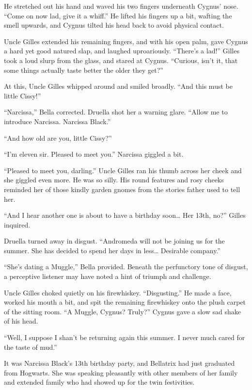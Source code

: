 He stretched out his hand and waved his two fingers underneath Cygnus’ nose. “Come on now lad, give it a whiff.” He lifted his fingers up a bit, wafting the smell upwards, and Cygnus tilted his head back to avoid physical contact.

Uncle Gilles extended his remaining fingers, and with his open palm, gave Cygnus a hard yet good natured slap, and laughed uproariously. “There’s a lad!” Gilles took a loud slurp from the glass, and stared at Cygnus. “Curious, isn’t it, that some things actually taste better the older they get?”

At this, Uncle Gilles whipped around and smiled broadly. “And this must be little Cissy!”

“Narcissa,” Bella corrected. Druella shot her a warning glare. “Allow me to introduce Narcissa. Narcissa Black.”

“And how old are you, little Cissy?”

“I’m eleven sir. Pleased to meet you.” Narcissa giggled a bit.

“Pleased to meet you, darling.” Uncle Gilles ran his thumb across her cheek and she giggled even more. He was so silly. His round features and rosy cheeks reminded her of those kindly garden gnomes from the stories father used to tell her.

“And I hear another one is about to have a birthday soon… Her 13th, no?” Gilles inquired.

Druella turned away in disgust. “Andromeda will not be joining us for the summer. She has decided to spend her days in less… Desirable company.”

“She’s dating a Muggle,” Bella provided. Beneath the perfunctory tone of disgust, a perceptive listener may have noted a hint of triumph and challenge.

Uncle Gilles choked quietly on his firewhiskey. “Disgusting.” He made a face, worked his mouth a bit, and spit the remaining firewhiskey onto the plush carpet of the sitting room. “A Muggle, Cygnus? Truly?” Cygnus gave a slow sad shake of his head.

“Well, I suppose I shan’t be returning again this summer. I never much cared for the taste of mud.”
\simpleline


It was Narcissa Black’s 13th birthday party, and Bellatrix had just graduated from Hogwarts. She was speaking pleasantly with other members of her family and extended family who had showed up for the twin festivities.

